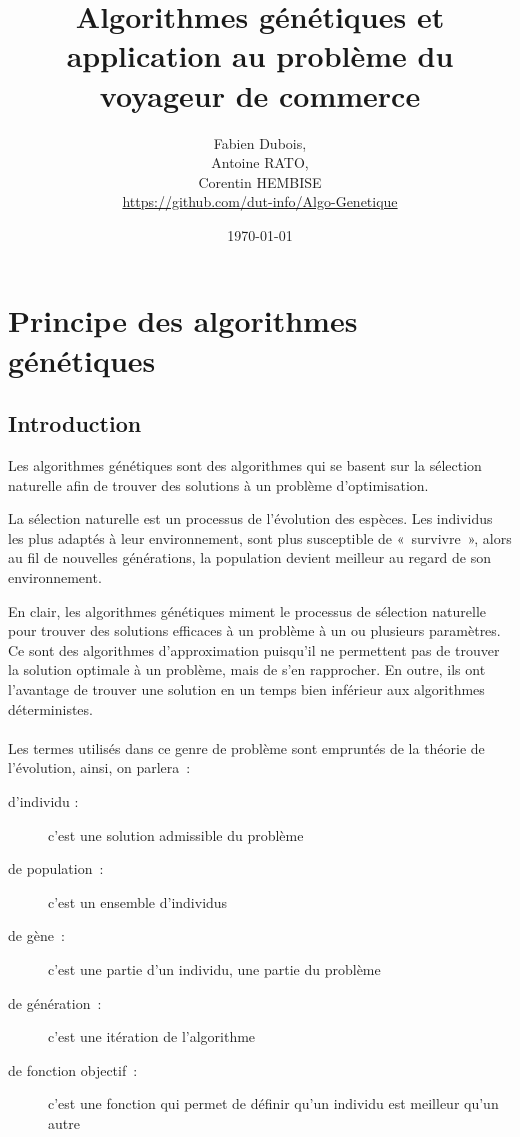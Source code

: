 \documentclass{article}
\begin{document}
\title{Algorithmes génétiques et application au problème du voyageur de commerce}
\author{Fabien Dubois,\\
   Antoine RATO,\\
   Corentin HEMBISE\\
   \url{https://github.com/dut-info/Algo-Genetique}\\}
\date{\today}

\maketitle

\tableofcontents

\newpage
\section{Principe des algorithmes génétiques}
	\subsection{Introduction}
	Les algorithmes génétiques sont des algorithmes qui se basent sur la sélection naturelle afin de trouver des solutions à un problème d'optimisation.

	La sélection naturelle est un processus de l'évolution des espèces. Les individus les plus adaptés à leur environnement, sont plus susceptible de « survivre », alors au fil de nouvelles générations, la population devient meilleur au regard de son environnement.

	En clair, les algorithmes génétiques miment le processus de sélection naturelle pour trouver des solutions efficaces à un problème à un ou plusieurs paramètres.
	Ce sont des algorithmes d'approximation puisqu'il ne permettent pas de trouver la solution optimale à un problème, mais de s'en rapprocher. En outre, ils ont l'avantage de trouver une solution en un temps bien inférieur aux algorithmes déterministes.

    \paragraph{}
	Les termes utilisés dans ce genre de problème sont empruntés de la théorie de l'évolution, ainsi, on parlera :
	\begin{description}
	\item [d'individu :] c'est une solution admissible du problème
	\item [de population :] c'est un ensemble d'individus
	\item [de gène :] c'est une partie d'un individu, une partie du problème
	\item [de génération :] c'est une itération de l'algorithme
	\item [de fonction objectif :] c'est une fonction qui permet de définir qu'un individu est meilleur qu'un autre
	\end{description}
\end{document}
